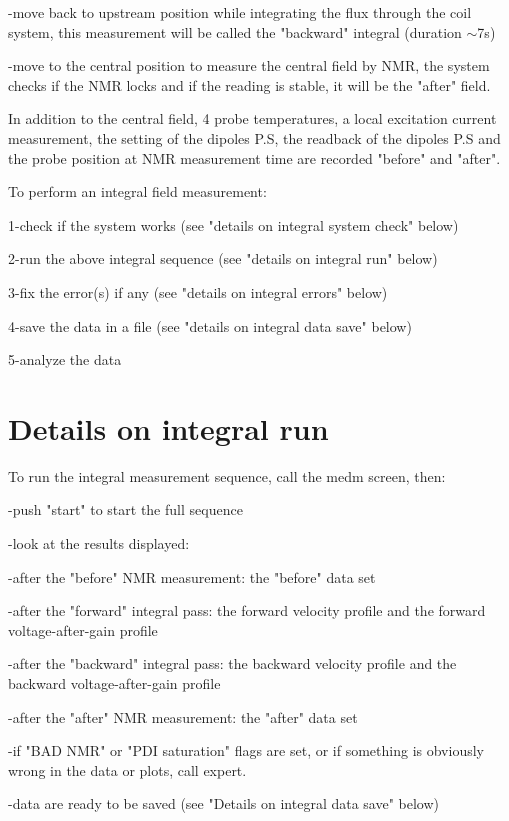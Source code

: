 {-move back to upstream position while integrating the flux through the coil
system, this measurement will be called the "backward" integral
(duration \( \sim  \)7s) 

-move to the central position to measure the central field by NMR, the system
checks if the NMR locks and if the reading is stable, it will be the 
"after"
field. 

In addition to the central field, 4 probe temperatures, a local excitation current
measurement, the setting of the dipoles P.S, the readback of the dipoles P.S
and the probe position at NMR measurement time are recorded 
"before"
and "after". 

To perform an integral field measurement: 

1-check if the system works (see "details on integral system 
check"
below) 

2-run the above integral sequence (see "details on integral run"
below) 

3-fix the error(s) if any (see "details on integral errors"
below) 

4-save the data in a file (see "details on integral data save"
below) 

5-analyze the data  


\section{Details on integral run }

To run the integral measurement sequence, call the 
medm screen, then: 

-push "start" to start the full sequence 

-look at the results displayed: 

-after the "before" NMR measurement: the 
"before"
data set 

-after the "forward" integral pass: the forward velocity profile
and the forward voltage-after-gain profile 

-after the "backward" integral pass: the backward velocity
profile and the backward voltage-after-gain profile 

-after the "after" NMR measurement: the 
"after"
data set 

-if "BAD NMR" or "PDI saturation" flags
are set, or if something is obviously wrong in the data or plots, call expert. 

-data are ready to be saved (see "Details on integral data save"
below) 


}
